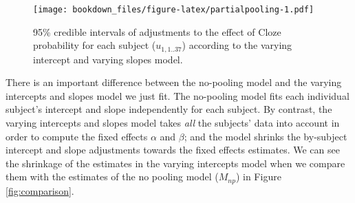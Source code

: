 \documentclass[12pt,]{krantz}
\theoremstyle{definition}
\theoremstyle{definition}
\theoremstyle{definition}
\theoremstyle{remark}
\begin{document}
\begin{figure}
\centering
\texttt{[image: bookdown\_files/figure-latex/partialpooling-1.pdf]}
\caption{\label{fig:partialpooling}95\% credible intervals of adjustments to the
effect of Cloze probability for each subject (\(u_{1,1..37}\)) according
to the varying intercept and varying slopes model.}
\end{figure}

There is an important difference between the no-pooling model and the
varying intercepts and slopes model we just fit. The no-pooling model
fits each individual subject's intercept and slope independently for
each subject. By contrast, the varying intercepts and slopes model takes
\emph{all} the subjects' data into account in order to compute the fixed
effects \(\alpha\) and \(\beta\); and the model shrinks the by-subject
intercept and slope adjustments towards the fixed effects estimates. We
can see the shrinkage of the estimates in the varying intercepts model
when we compare them with the estimates of the no pooling model
(\(M_{np}\)) in Figure \ref{fig:comparison}.
\end{document}
